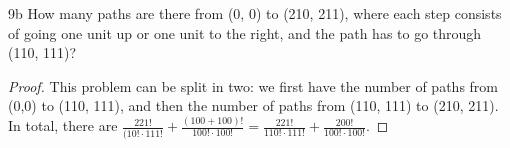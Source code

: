 \begin{exercise}{9b}
How many paths are there from (0, 0) to (210, 211), where each step consists of going
one unit up or one unit to the right, and the path has to go through (110, 111)?
\end{exercise}

\begin{proof}
    This problem can be split in two: we first have the number of paths from (0,0) to (110, 111), and then the number of paths from (110, 111) to (210, 211). In total, there are  $\frac{221!}{(10! \cdot 111!}+\frac{(100+100)!}{100! \cdot 100!}=\frac{221!}{110! \cdot 111!}+\frac{200!}{100! \cdot 100!}$.
\end{proof}

